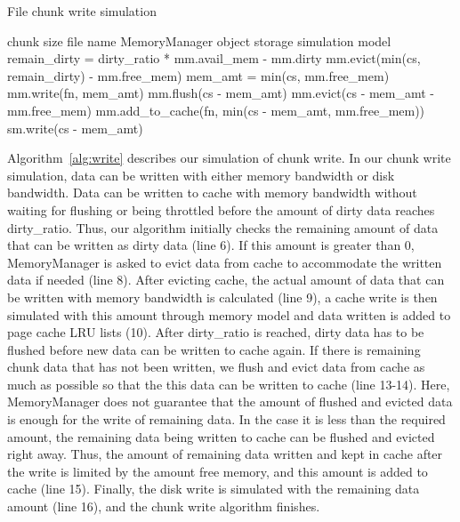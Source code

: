\documentclass[conference]{IEEEtran}
\newcommand{\Desc}[2]{\State \makebox[2em][l]{#1}#2}
\begin{document}
			\begin{algorithm}\caption{File chunk write simulation}\label{alg:write}
				\small
				\begin{algorithmic}[1]
					\Input
        				\Desc{cs}{chunk size}
        				\Desc{fn}{file name}
						\Desc{mm}{MemoryManager object}
						\Desc{sm}{storage simulation model}
   					\EndInput
					\State remain\_dirty = dirty\_ratio * mm.avail\_mem - mm.dirty
					 
    					\State mm.evict(min(cs, remain\_dirty) - mm.free\_mem)
    					\State mem\_amt = min(cs, mm.free\_mem)
    					\State mm.write(fn, mem\_amt) 
    				\EndIf
					  
						\State mm.flush(cs - mem\_amt)  
						\State mm.evict(cs - mem\_amt  - mm.free\_mem) 
						\State mm.add\_to\_cache(fn, min(cs - mem\_amt, mm.free\_mem))
						\State sm.write(cs - mem\_amt)
					\EndIf
					
				\end{algorithmic}
			\end{algorithm}

			Algorithm~\ref{alg:write} describes our simulation of chunk write. 
			In our chunk write simulation, data can be written with either memory bandwidth 
			or disk bandwidth. 
			Data can be written to cache with memory bandwidth without waiting for 
			flushing or being throttled before the amount of dirty data reaches dirty\_ratio. 
			Thus, our algorithm initially checks the remaining amount of data that can be written 
			as dirty data (line 6).
			If this amount is greater than 0, MemoryManager is asked to evict 
			data from cache to accommodate the written data if needed (line 8). 
			After evicting cache, the actual amount of data that can be written with 
			memory bandwidth is calculated (line 9), a cache write is then simulated 
			with this amount through memory model and data written is added to 
			page cache LRU lists (10).
			After dirty\_ratio is reached, dirty data has to be flushed before new data 
			can be written to cache again. 
			If there is remaining chunk data that has not been written, we flush and 
			evict data from cache as much as possible so that the this data can be 
			written to cache (line 13-14). 
			Here, MemoryManager does not guarantee that the amount of flushed 
			and evicted data is enough for the write of remaining data. 
			In the case it is less than the required amount, the remaining data 
			being written to cache can be flushed and evicted right away. 
			Thus, the amount of remaining data written and kept in cache 
			after the write is limited by the amount free memory, and this amount 
			is added to cache (line 15). 
			Finally, the disk write is simulated with the remaining data amount (line 16), 
			and the chunk write algorithm finishes.
			
\end{document}
